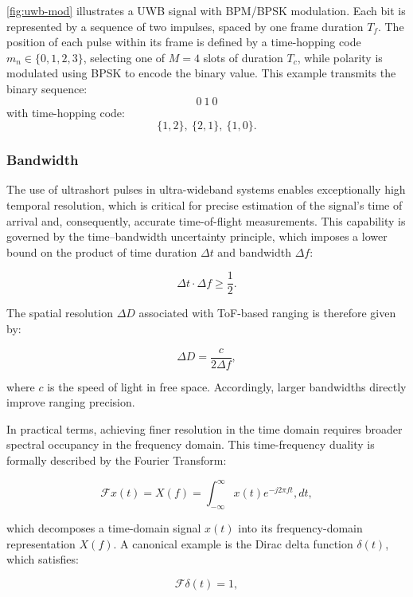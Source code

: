 \autoref{fig:uwb-mod} illustrates a UWB signal with BPM/BPSK modulation. Each bit is represented by a sequence of two impulses, spaced by one frame duration $T_f$. The position of each pulse within its frame is defined by a time-hopping code  $m_n \in \{0, 1, 2, 3\}$, selecting one of $M = 4$ slots of duration $T_c$, while polarity is modulated using BPSK to encode the binary value. This example transmits the binary sequence:  
$$
\boxed{0\ 1\ 0}
$$ 
with time-hopping code:  
$$
\{1, 2\},\ \{2, 1\},\ \{1, 0\}.
$$ 

\subsubsection{Bandwidth}
The use of ultrashort pulses in ultra-wideband systems enables exceptionally high temporal resolution, which is critical for precise estimation of the signal's time of arrival and, consequently, accurate time-of-flight measurements. This capability is governed by the time–bandwidth uncertainty principle, which imposes a lower bound on the product of time duration $\Delta t$ and bandwidth $\Delta f$:

\begin{equation} \Delta t \cdot \Delta f \geq \frac{1}{2}. \end{equation}

The spatial resolution $\Delta D$ associated with ToF-based ranging is therefore given by:

\begin{equation} \Delta D = \frac{c}{2\Delta f}, \end{equation}

where $c$ is the speed of light in free space. Accordingly, larger bandwidths directly improve ranging precision.

In practical terms, achieving finer resolution in the time domain requires broader spectral occupancy in the frequency domain. This time-frequency duality is formally described by the Fourier Transform:

\begin{equation} 
\mathcal{F}{x(t)} = X(f) = \int_{-\infty}^{\infty} x(t) e^{-j2\pi ft} , dt, 
\end{equation}



which decomposes a time-domain signal $x(t)$ into its frequency-domain representation $X(f)$. A canonical example is the Dirac delta function $\delta(t)$, which satisfies:

\begin{equation} \mathcal{F}{\delta(t)} = 1, \end{equation}

